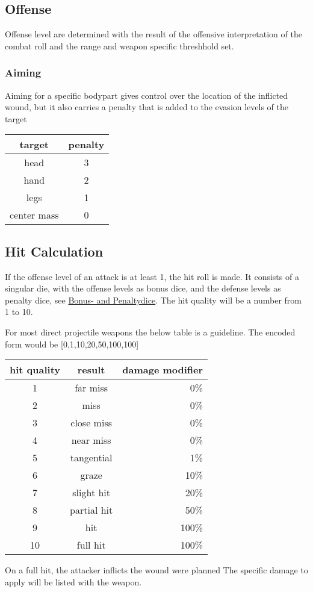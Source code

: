 \subsection{Offense}\label{subsec:offense}
Offense level are determined with the result of the offensive \-interpretation of the combat roll \-and the range and
weapon \-specific threshhold set.\par
\subsubsection{Aiming}\label{subsubsec:aiming}
Aiming for a specific bodypart gives control over the location of the inflicted wound, but it also carries a penalty
that is added to the evasion levels of the target

\begin{tabular}{cc}
    target & penalty\\\hline
    head & 3 \\
    hand & 2 \\
    legs & 1 \\
    center mass & 0
\end{tabular}

\subsection{Hit Calculation}\label{subsec:hit}
If the offense level of an attack is at least 1, the hit roll is made.
It consists of a singular die, with the offense levels as bonus dice, and the defense levels as penalty dice,
see \hyperref[sec:bonus--and-penaltydice]{Bonus- and Penaltydice}.
The hit quality will be a number from 1 to 10. \par
For most direct projectile weapons the below table is a guideline.
The encoded form would be [0,1,10,20,50,100,100]

\begin{tabular}{c|cr}
    hit quality & result & damage modifier \\\hline
    1 & far miss & 0\%\\
    2 & miss& 0\%\\
    3 & close miss& 0\%\\
    4 & near miss& 0\%\\
    5 & tangential& 1\%\\
    6 & graze& 10\%\\
    7 & slight hit& 20\%\\
    8 & partial hit& 50\%\\
    9 & hit& 100\%\\
    10 & full hit& 100\%\\
\end{tabular}

On a full hit, the attacker inflicts the wound were planned
The specific damage to apply will be listed with the weapon.


